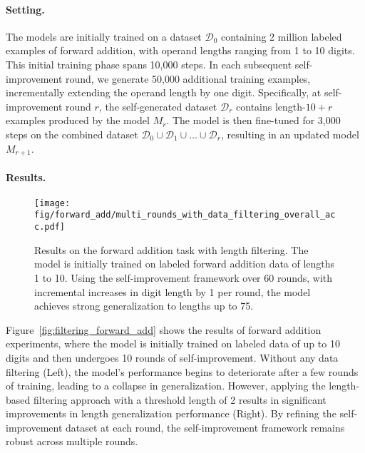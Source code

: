 \paragraph{Setting.}
The models are initially trained on a dataset $\mathcal{D}_0$ containing 2 million labeled examples of forward addition, with operand lengths ranging from 1 to 10 digits. This initial training phase spans 10,000 steps. In each subsequent self-improvement round, we generate 50,000 additional training examples, incrementally extending the operand length by one digit. Specifically, at self-improvement round \( r \), the self-generated dataset $\mathcal{D}_r$ contains length-\( 10+r \) examples produced by the model \( M_r \). The model is then fine-tuned for 3,000 steps on the combined dataset $\mathcal{D}_0 \cup \mathcal{D}_1 \cup \dots \cup \mathcal{D}_r$, resulting in an updated model \( M_{r+1} \).

\paragraph{Results.}

\begin{wrapfigure}{r}{0.5\textwidth}
    \vspace{-8mm}
    \centering
    \texttt{[image: fig/forward\_add/multi\_rounds\_with\_data\_filtering\_overall\_acc.pdf]}
    \caption{Results on the forward addition task with length filtering. The model is initially trained on labeled forward addition data of lengths 1 to 10. Using the self-improvement framework over 60 rounds, with incremental increases in digit length by 1 per round, the model achieves strong generalization to lengths up to 75.}
    \vspace{-5mm}
    \label{fig:forward_add}
\end{wrapfigure}

Figure~\ref{fig:filtering_forward_add} shows the results of forward addition experiments, where the model is initially trained on labeled data of up to 10 digits and then undergoes 10 rounds of self-improvement.
Without any data filtering (Left), the model's performance begins to deteriorate after a few rounds of training, leading to a collapse in generalization. However, applying the length-based filtering approach with a threshold length of 2 results in significant improvements in length generalization performance (Right). By refining the self-improvement dataset at each round, the self-improvement framework remains robust across multiple rounds.

